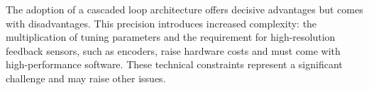 The adoption of a cascaded loop architecture offers decisive advantages but comes with disadvantages. This precision introduces increased complexity: the multiplication of tuning parameters and the requirement for high-resolution feedback sensors, such as encoders, raise hardware costs and must come with high-performance software. These technical constraints represent a significant challenge and may raise other issues.




